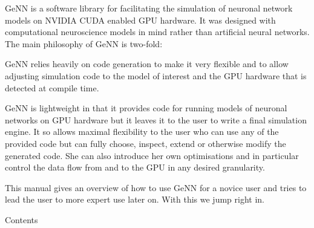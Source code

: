 Ge\+N\+N is a software library for facilitating the simulation of neuronal network models on N\+V\+I\+D\+I\+A C\+U\+D\+A enabled G\+P\+U hardware. It was designed with computational neuroscience models in mind rather than artificial neural networks. The main philosophy of Ge\+N\+N is two-\/fold\+:
\begin{DoxyEnumerate}
\item Ge\+N\+N relies heavily on code generation to make it very flexible and to allow adjusting simulation code to the model of interest and the G\+P\+U hardware that is detected at compile time.
\item Ge\+N\+N is lightweight in that it provides code for running models of neuronal networks on G\+P\+U hardware but it leaves it to the user to write a final simulation engine. It so allows maximal flexibility to the user who can use any of the provided code but can fully choose, inspect, extend or otherwise modify the generated code. She can also introduce her own optimisations and in particular control the data flow from and to the G\+P\+U in any desired granularity.
\end{DoxyEnumerate}

This manual gives an overview of how to use Ge\+N\+N for a novice user and tries to lead the user to more expert use later on. With this we jump right in.

Contents

